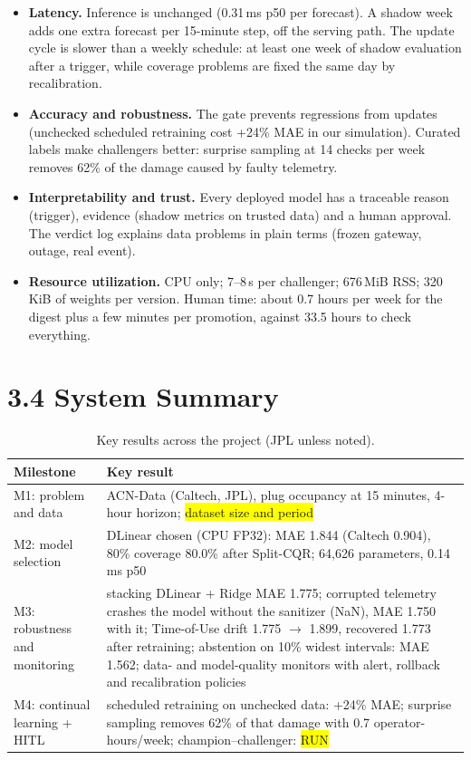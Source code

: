\documentclass[11pt,letterpaper]{article}
\newcommand{\run}{\colorbox{yellow}{\footnotesize RUN}}
\newcommand{\fillin}[1]{\colorbox{yellow}{#1}}
\begin{document}
\begin{itemize}
  \item \textbf{Latency.} Inference is unchanged (0.31\,ms p50 per forecast). A shadow week adds one extra forecast per
  15-minute step, off the serving path. The update cycle is slower than a weekly schedule: at least one week of shadow
  evaluation after a trigger, while coverage problems are fixed the same day by recalibration.
  \item \textbf{Accuracy and robustness.} The gate prevents regressions from updates (unchecked scheduled retraining
  cost +24\% MAE in our simulation). Curated labels make challengers better: surprise sampling at 14 checks per week
  removes 62\% of the damage caused by faulty telemetry.
  \item \textbf{Interpretability and trust.} Every deployed model has a traceable reason (trigger), evidence (shadow
  metrics on trusted data) and a human approval. The verdict log explains data problems in plain terms (frozen
  gateway, outage, real event).
  \item \textbf{Resource utilization.} CPU only; 7--8\,s per challenger; 676\,MiB RSS; 320\,KiB of weights per
  version. Human time: about 0.7 hours per week for the digest plus a few minutes per promotion, against 33.5 hours to
  check everything.
\end{itemize}

\section*{3.4 System Summary}

\begin{table}[H]
\centering\small
\caption{Key results across the project (JPL unless noted).}
\begin{tabularx}{\textwidth}{@{}lY@{}}
\toprule
Milestone & Key result \\
\midrule
M1: problem and data & ACN-Data (Caltech, JPL), plug occupancy at 15 minutes, 4-hour horizon; \fillin{dataset size and period} \\
M2: model selection & DLinear chosen (CPU FP32): MAE 1.844 (Caltech 0.904), 80\% coverage 80.0\% after Split-CQR; 64{,}626 parameters, 0.14\,ms p50 \\
M3: robustness and monitoring & stacking DLinear + Ridge MAE 1.775; corrupted telemetry crashes the model without the sanitizer (NaN), MAE 1.750 with it; Time-of-Use drift 1.775 $\to$ 1.899, recovered 1.773 after retraining; abstention on 10\% widest intervals: MAE 1.562; data- and model-quality monitors with alert, rollback and recalibration policies \\
M4: continual learning + HITL & scheduled retraining on unchecked data: +24\% MAE; surprise sampling removes 62\% of that damage with 0.7 operator-hours/week; champion--challenger: \run \\
\bottomrule
\end{tabularx}
\end{table}
\end{document}
